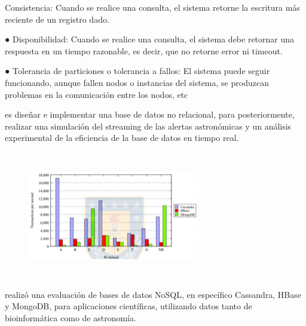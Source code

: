 \documentclass[12pt]{article}
\begin{document}
\begin{multicols}{2}
{\fontsize{9pt}{10.8pt}\selectfont Consistencia: Cuando se realice una consulta, el sistema retorne la escritura más reciente de un registro dado. \par}\par

{\fontsize{9pt}{10.8pt}\selectfont ● Disponibilidad: Cuando se realice una consulta, el sistema debe retornar una respuesta en un tiempo razonable, es decir, que no retorne error ni timeout. \par}\par

{\fontsize{9pt}{10.8pt}\selectfont ● Tolerancia de particiones o tolerancia a fallos: El sistema puede seguir funcionando, aunque fallen nodos o instancias del sistema, se produzcan problemas en la comunicación entre los nodos, etc\par}\par

{\fontsize{9pt}{10.8pt}\selectfont es diseñar e implementar una base de datos no relacional, para posteriormente, realizar una simulación del streaming de las alertas astronómicas y un análisis experimental de la eficiencia de la base de datos en tiempo real.\par}\par




\begin{figure}[H]
	\begin{FlushRight}		\includegraphics[width=2.96in,height=2.19in]{./media/image7.png}
	\end{FlushRight}\end{figure}



{\fontsize{9pt}{10.8pt}\selectfont realizó una evaluación de bases de datos NoSQL, en específico Cassandra, HBase y MongoDB, para aplicaciones científicas, utilizando datos tanto de bioinformática como de astronomía.\par}\par


\end{multicols}
\end{document}
